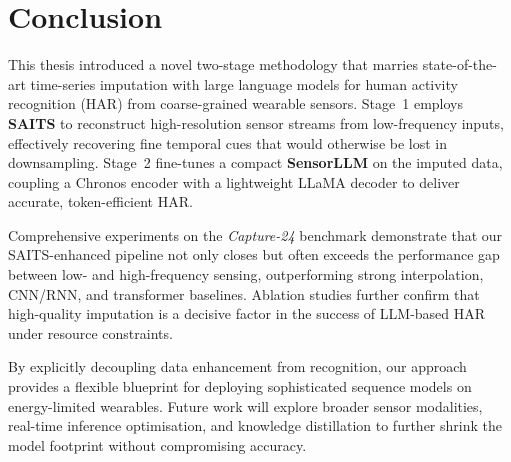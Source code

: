 \chapter{Conclusion}

\hspace{2em}This thesis introduced a novel two-stage methodology that marries state-of-the-art time-series imputation with large language models for human activity recognition (HAR) from coarse-grained wearable sensors. Stage~1 employs \textbf{SAITS} to reconstruct high-resolution sensor streams from low-frequency inputs, effectively recovering fine temporal cues that would otherwise be lost in downsampling. Stage~2 fine-tunes a compact \textbf{SensorLLM} on the imputed data, coupling a Chronos encoder with a lightweight LLaMA decoder to deliver accurate, token-efficient HAR.

\hspace{2em}Comprehensive experiments on the \textit{Capture-24} benchmark demonstrate that our SAITS-enhanced pipeline not only closes but often exceeds the performance gap between low- and high-frequency sensing, outperforming strong interpolation, CNN/RNN, and transformer baselines. Ablation studies further confirm that high-quality imputation is a decisive factor in the success of LLM-based HAR under resource constraints.

\hspace{2em}By explicitly decoupling data enhancement from recognition, our approach provides a flexible blueprint for deploying sophisticated sequence models on energy-limited wearables. Future work will explore broader sensor modalities, real-time inference optimisation, and knowledge distillation to further shrink the model footprint without compromising accuracy.
